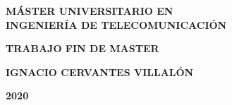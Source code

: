 \pagestyle{empty}

\vspace*{5.5cm}

\begin{center}

{\Large\rm \textbf{ MÁSTER UNIVERSITARIO EN\\
INGENIERÍA DE TELECOMUNICACIÓN\\}}

\vspace{1.0cm}

{\Large\rm \textbf{TRABAJO FIN DE MASTER}}

\vspace{2cm}

{\Large\rm\textbf{\tfgtitle}}

\vspace*{\fill}

{\Large\rm\textbf{IGNACIO CERVANTES VILLALÓN}}

{\Large \textbf{2020}}
\vspace{1.0cm}
\end{center}

